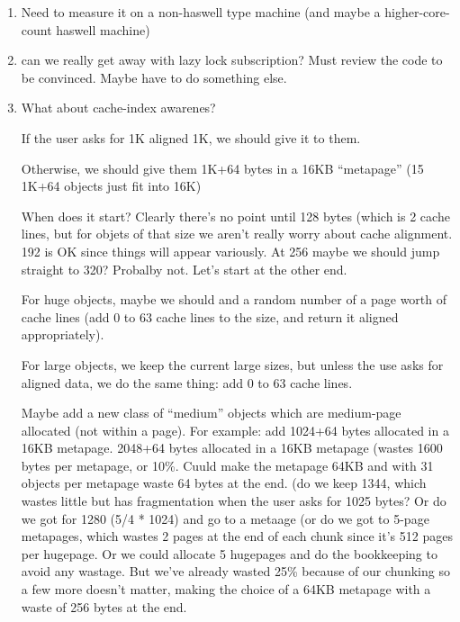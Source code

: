 \begin{enumerate}
\item Need to measure it on a non-haswell type machine (and maybe a higher-core-count haswell machine)

\item can we really get away with lazy lock subscription?  Must review the code to be convinced.  Maybe have to do something else.

\item What about cache-index awarenes? 

 If the user asks for 1K aligned 1K, we should give it to them.

 Otherwise, we should give them 1K+64 bytes in a 16KB ``metapage'' (15 1K+64 objects just fit into 16K)
 
 When does it start?  Clearly there's no point until 128 bytes (which is 2 cache lines, but for objets of that size we aren't really worry about cache alignment.  192 is OK since things will appear variously.  At 256 maybe we should jump straight to 320?  Probalby not. 
   Let's start at the other end.  

   For huge objects, maybe we should and a random number of a page worth of cache lines (add 0 to 63 cache lines to the size, and return it aligned appropriately).

   For large objects, we keep the current large sizes, but unless the use asks for aligned data, we do the same thing: add 0 to 63 cache lines.

   Maybe add a new class of ``medium'' objects which are medium-page allocated (not within a page). 
    For example: add
      1024+64 bytes allocated in a 16KB metapage.
      2048+64 bytes allocated in a 16KB metapage (wastes 1600 bytes per metapage, or 10\%.  Cuuld make the metapage 64KB and with 31 objects per metapage waste 64 bytes at the end.
       (do we keep 1344, which wastes little but has fragmentation when the user asks for 1025 bytes?  Or do we got for 1280 (5/4 * 1024) and go to a metaage
          (or do we got to 5-page metapages, which wastes 2 pages at the end of each chunk since it's 512 pages per hugepage. Or we could allocate 5 hugepages and do the bookkeeping to avoid any wastage.  But we've already wasted 25\% because of our chunking so a few more doesn't matter, making the choice of a 64KB metapage with a waste of 256 bytes at the end.


\end{enumerate}

